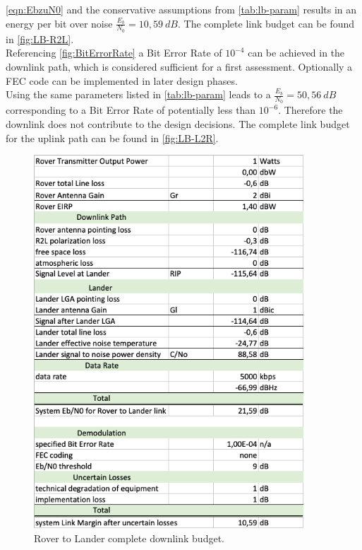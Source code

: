 \autoref{eqn:EbzuN0} and the conservative assumptions from \autoref{tab:lb-param} results in an energy per bit over noise $\frac{{E}_{b}}{{N}_{0}} = 10,59\ dB$. The complete link budget can be found in \autoref{fig:LB-R2L}. \\
Referencing \autoref{fig:BitErrorRate} a Bit Error Rate of $10^{-4}$ can be achieved in the downlink path, which is considered sufficient for a first assessment. Optionally a FEC code can be implemented in later design phases.\\

Using the same parameters listed in \autoref{tab:lb-param} leads to a $\frac{{E}_{b}}{{N}_{0}} = 50,56\ dB$ corresponding to a Bit Error Rate of potentially less than $10^{-6}$. Therefore the downlink does not contribute to the design decisions. The complete link budget for the uplink path can be found in \autoref{fig:LB-L2R}.

\begin{figure}[h]
	\centering
  		\includegraphics[width=0.9\textwidth]{Media/LB-RovertoLander.png}
  \caption{Rover to Lander complete downlink budget.}
  \label{fig:LB-R2L}
\end{figure}

